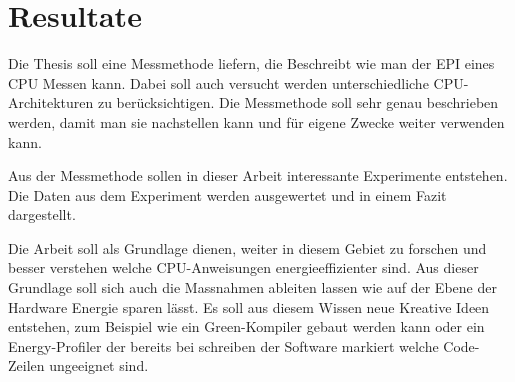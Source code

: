 \chapter{Resultate}

Die Thesis soll eine Messmethode liefern, die Beschreibt wie man der EPI eines CPU Messen kann. Dabei soll auch versucht werden
unterschiedliche CPU-Architekturen zu berücksichtigen. Die Messmethode soll sehr genau beschrieben werden, damit man sie
nachstellen kann und für eigene Zwecke weiter verwenden kann.
\par
Aus der Messmethode sollen in dieser Arbeit interessante Experimente entstehen. Die Daten aus dem Experiment werden ausgewertet
und in einem Fazit dargestellt.
\par
Die Arbeit soll als Grundlage dienen, weiter in diesem Gebiet zu forschen und besser verstehen welche CPU-Anweisungen energieeffizienter
sind. Aus dieser Grundlage soll sich auch die Massnahmen ableiten lassen wie auf der Ebene der Hardware Energie sparen lässt. Es soll
aus diesem Wissen neue Kreative Ideen entstehen, zum Beispiel wie ein Green-Kompiler gebaut werden kann oder ein Energy-Profiler
der bereits bei schreiben der Software markiert welche Code-Zeilen ungeeignet sind.



